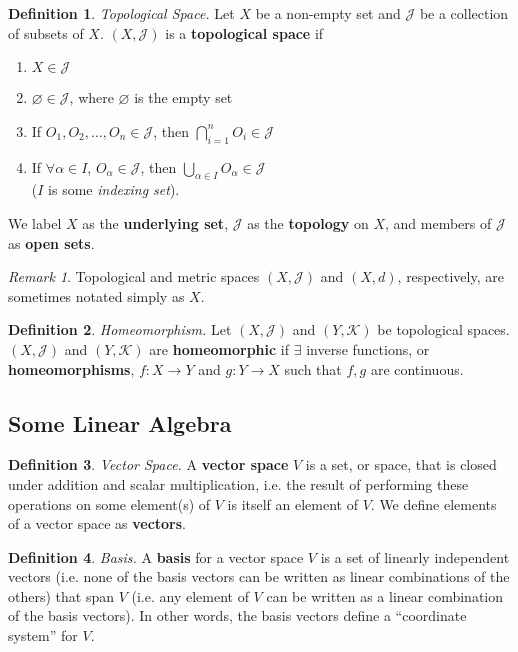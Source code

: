 \documentclass[10pt,landscape]{article}
\theoremstyle{definition}
\newtheorem{definition}{Definition}[section]
\theoremstyle{remark}
\newtheorem*{remark}{Remark}
\begin{document}
\begin{multicols*}{3}
\theoremstyle{definition}
\begin{definition}{\textit{Topological Space.}}
Let $X$ be a non-empty set and $\mathcal{J}$ be a collection of subsets of $X$. $(X, \mathcal{J})$ is a \textbf{topological space} if
\begin{enumerate}
    \item $X \in \mathcal{J}$
    \item $\varnothing \in \mathcal{J}$, where $\varnothing$ is the empty set
    \item If $O_1, O_2, \ldots , O_n \in \mathcal{J}$, then $\bigcap_{i=1}^nO_i\in\mathcal{J}$
    \item If $\forall \alpha \in I$, $O_\alpha\in\mathcal{J}$, then $\bigcup_{\alpha\in I}O_\alpha\in\mathcal{J}$ \\($I$ is some \textit{indexing set}).
\end{enumerate}
We label $X$ as the \textbf{underlying set}, $\mathcal{J}$ as the \textbf{topology} on $X$, and members of $\mathcal{J}$ as \textbf{open sets}.

\end{definition}

\begin{remark}
Topological and metric spaces $(X,\mathcal{J})$ and $(X, d)$, respectively, are sometimes notated simply as $X$.
\end{remark}

\theoremstyle{definition}
\begin{definition}{\textit{Homeomorphism.}}
Let $(X,\mathcal{J})$ and $(Y, \mathcal{K})$ be topological spaces. $(X,\mathcal{J})$ and $(Y, \mathcal{K})$ are \textbf{homeomorphic} if $\exists$ inverse functions, or \textbf{homeomorphisms}, $f:X\rightarrow Y$ and $g:Y\rightarrow X$ such that $f, g$ are continuous.
\end{definition}

\subsection{Some Linear Algebra}
\begin{definition}{\textit{Vector Space.}}
A \textbf{vector space} $V$ is a set, or space, that is closed under addition and scalar multiplication, i.e. the result of performing these operations on some element(s) of $V$ is itself an element of $V$. We define elements of a vector space as \textbf{vectors}.
\end{definition}

\begin{definition}{\textit{Basis.}}
A \textbf{basis} for a vector space $V$ is a set of linearly independent vectors (i.e. none of the basis vectors can be written as linear combinations of the others) that span $V$ (i.e. any element of $V$ can be written as a linear combination of the basis vectors). In other words, the basis vectors define a ``coordinate system'' for $V$.
\end{definition}


\end{multicols*}
\end{document}
